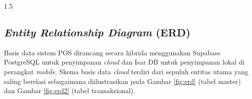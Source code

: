 \documentclass[12pt, a4paper, onecolumn, oneside]{report}
\begin{document}
\begin{spacing}{1.5}
%
%
%
%
%

\subsection{\textit{Entity Relationship Diagram} (ERD)}

Basis data sistem POS dirancang secara hibrida menggunakan Supabase PostgreSQL untuk penyimpanan \textit{cloud} dan Isar DB untuk penyimpanan lokal di perangkat \textit{mobile}. Skema basis data \textit{cloud} terdiri dari sepuluh entitas utama yang saling berelasi sebagaimana diilustrasikan pada Gambar \ref{fig:erd} (tabel master) dan Gambar \ref{fig:erd2} (tabel transaksional).

\begin{landscape}
\begin{figure}[p]
\centering
{}
\end{figure}
\end{landscape}
\end{spacing}
\end{document}
